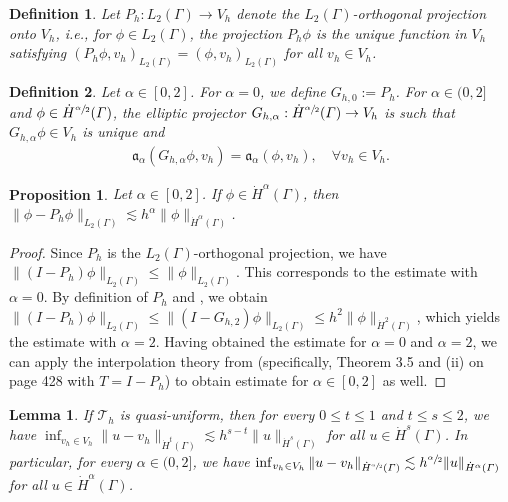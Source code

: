 \documentclass[numbers,webpdf]{ima-authoring-template}%
\theoremstyle{thmstyletwo}%
\newtheorem{proposition}[theorem]{Proposition}%
\newtheorem{lemma}{Lemma}%
\newtheorem{definition}{Definition}
\numberwithin{equation}{section}
\begin{document}
\begin{definition}
Let $P_h:L_2(\Gamma)\to V_h$ denote the $L_2(\Gamma)$-orthogonal projection onto $V_h$, i.e., for $\phi\in L_2(\Gamma)$, the projection $P_h\phi$ is the unique function in $V_h$ satisfying $(P_h\phi,v_h)_{L_2(\Gamma)} = (\phi,v_h)_{L_2(\Gamma)}$ for all $v_h\in V_h$.
\end{definition}
\begin{definition}
Let $\alpha\in[0,2]$. For $\alpha=0$, we define $G_{h,0}:=P_h$. For $\alpha\in(0,2]$ and $\phi\in\dot{H}^{\sfrac{\alpha}{2}}({\mit\varGamma})$, the elliptic projector $G_{h,\alpha}:\dot{H}^{\sfrac{\alpha}{2}}({\mit\varGamma})\to V_h$ is such that $G_{h,\alpha}\phi\in V_h$ is unique and
\begin{align}
\label{eq:elliptic_projector}
        \mathfrak{a}_{\alpha}(G_{h,\alpha}\phi,v_h) = \mathfrak{a}_{\alpha}(\phi,v_h),\quad\forall v_h\in V_h.
\end{align}

\end{definition}
\begin{proposition}
\label{proposition:with_projection}
    Let $\alpha\in[0,2]$. If $\phi\in\dot{H}^{\alpha}(\Gamma)$, then $\|\phi-P_h \phi\|_{L_2(\Gamma)}\lesssim h^{\alpha}\|\phi\|_{\dot{H}^{\alpha}(\Gamma)}$.
\end{proposition}
\begin{proof}
    Since $P_h$ is the $L_2(\Gamma)$-orthogonal projection, we have $\|(I-P_h)\phi\|_{L_2(\Gamma)}\leq\|\phi\|_{L_2(\Gamma)}$. This corresponds to the estimate with $\alpha = 0$. By definition of $P_h$ and \cite[Proposition~6.2]{bolin2023regularity}, we obtain $\|(I-P_h)\phi\|_{L_2(\Gamma)}\leq\|(I-G_{h,2})\phi\|_{L_2(\Gamma)}\leq h^2\|\phi\|_{\dot{H}^2(\Gamma)}$, which yields the estimate with $\alpha = 2$. Having obtained the estimate for $\alpha = 0$ and $\alpha=2$, we can apply the interpolation theory from \cite[Section~3.2]{ChandlerWilde2015interpolation} (specifically,  Theorem 3.5 and (ii) on page 428 with $T=I-P_h$) to obtain estimate for $\alpha\in[0,2]$ as well. %
    \hfill
\end{proof}
\begin{lemma}
\label{lem:graph-fractional-fe-approx}
    If $\mathcal{T}_h$ is quasi-uniform, then for every $0\leq t\leq1$ and $t\leq s\leq2$, we have $\inf_{v_h\in V_h}\|u-v_h\|_{\dot H^t(\Gamma)}\lesssim h^{s-t}\|u\|_{\dot H^s(\Gamma)}$ for all $u\in \dot H^s(\Gamma)$. In particular, for every $\alpha\in(0,2]$, we have $\inf_{v_h\in V_h}\|u-v_h\|_{\dot H^{\sfrac{\alpha}{2}}({\mit\varGamma})}\lesssim h^{\sfrac{\alpha}{2}}\|u\|_{\dot H^\alpha({\mit\varGamma})}$ for all $u\in \dot H^\alpha(\Gamma)$.
\end{lemma}
\end{document}
